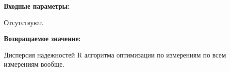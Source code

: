\textbf{Входные параметры:}

Отсутствуют.

\textbf{Возвращаемое значение:}

Дисперсия надежностей R алгоритма оптимизации по измерениям по всем измерениям вообще.